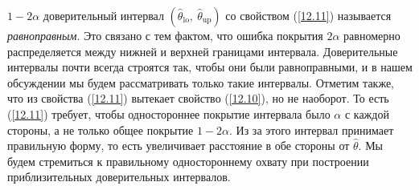 $1 - 2 \alpha$ доверительный интервал $(\widehat{\theta}_{\text{lo}}, \ \widehat{\theta}_{\text{up}})$ со свойством (\ref{12.11}) называется \textit{равноправным}. Это связано с тем фактом, что ошибка покрытия $2 \alpha$ равномерно распределяется между нижней и верхней границами интервала. Доверительные интервалы почти всегда строятся так, чтобы они были равноправными, и в нашем обсуждении мы будем рассматривать только такие интервалы. Отметим также, что из свойства (\ref{12.11}) вытекает свойство (\ref{12.10}), но не наоборот. То есть (\ref{12.11}) требует, чтобы одностороннее покрытие интервала было $\alpha$  с каждой стороны, а не только общее покрытие $1 - 2 \alpha$. Из за этого интервал принимает правильную форму, то есть увеличивает расстояние в обе стороны от $\widehat{\theta}$. Мы будем стремиться к правильному одностороннему охвату при построении приблизительных доверительных интервалов.

